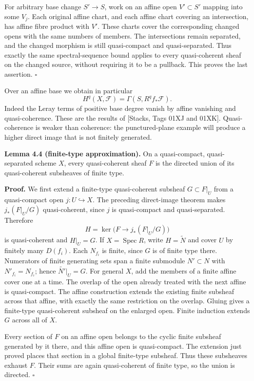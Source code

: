\documentclass[11pt]{article}
\begin{document}
For arbitrary base change \(S'\to S\), work on an affine open
\(V'\subset S'\) mapping into some \(V_j\). Each original affine chart,
and each affine chart covering an intersection, has affine fibre product
with \(V'\). These charts cover the corresponding changed opens with the
same numbers of members. The intersections remain separated, and the
changed morphism is still quasi-compact and quasi-separated. Thus
exactly the same spectral-sequence bound applies to every quasi-coherent
sheaf on the changed source, without requiring it to be a pullback. This
proves the last assertion. \(\square\)

Over an affine base we obtain in particular \[
H^q(X,\mathcal F)=\Gamma(S,R^qf_*\mathcal F).
\] Indeed the Leray terms of positive base degree vanish by affine
vanishing and quasi-coherence. These are the results of {[}Stacks, Tags
01XJ and 01XK{]}. Quasi-coherence is weaker than coherence: the
punctured-plane example will produce a higher direct image that is not
finitely generated.

\textbf{Lemma 4.4 (finite-type approximation).} On a quasi-compact,
quasi-separated scheme \(X\), every quasi-coherent sheaf \(F\) is the
directed union of its quasi-coherent subsheaves of finite type.

\textbf{Proof.} We first extend a finite-type quasi-coherent subsheaf
\(G\subset F|_U\) from a quasi-compact open \(j:U\hookrightarrow X\).
The preceding direct-image theorem makes \(j_*(F|_U/G)\) quasi-coherent,
since \(j\) is quasi-compact and quasi-separated. Therefore \[
H=\ker\bigl(F\longrightarrow j_*(F|_U/G)\bigr)
\] is quasi-coherent and \(H|_U=G\). If \(X=\operatorname{Spec}R\),
write \(H=\widetilde N\) and cover \(U\) by finitely many \(D(f_i)\).
Each \(N_{f_i}\) is finite, since \(G\) is of finite type there.
Numerators of finite generating sets span a finite submodule
\(N'\subset N\) with \(N'_{f_i}=N_{f_i}\); hence
\(\widetilde{N'}|_U=G\). For general \(X\), add the members of a finite
affine cover one at a time. The overlap of the open already treated with
the next affine is quasi-compact. The affine construction extends the
existing finite subsheaf across that affine, with exactly the same
restriction on the overlap. Gluing gives a finite-type quasi-coherent
subsheaf on the enlarged open. Finite induction extends \(G\) across all
of \(X\).

Every section of \(F\) on an affine open belongs to the cyclic finite
subsheaf generated by it there, and this affine open is quasi-compact.
The extension just proved places that section in a global finite-type
subsheaf. Thus these subsheaves exhaust \(F\). Their sums are again
quasi-coherent of finite type, so the union is directed. \(\square\)
\end{document}
